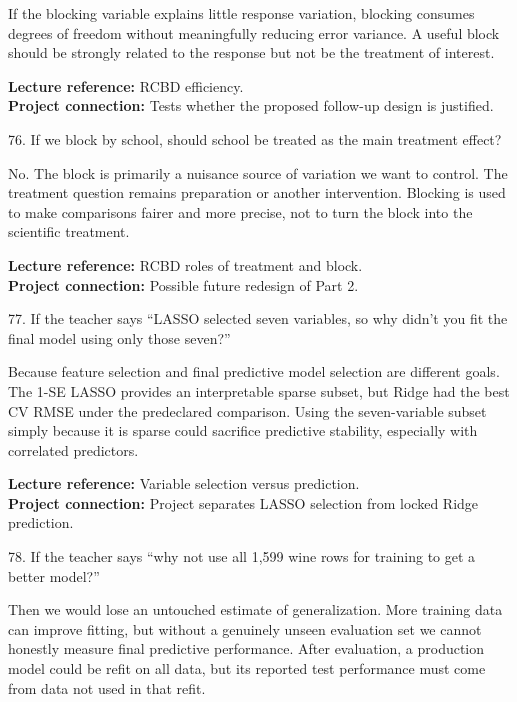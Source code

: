 \documentclass[10.5pt,a4paper]{article}
\newcommand{\chapref}[1]{\textbf{Lecture reference:} #1}
\newcommand{\projectref}[1]{\textbf{Project connection:} #1}
\begin{document}
\begin{answerbox}If the blocking variable explains little response variation, blocking consumes degrees of freedom without meaningfully reducing error variance. A useful block should be strongly related to the response but not be the treatment of interest.\end{answerbox}
\begin{refbox}\chapref{RCBD efficiency.}\\\projectref{Tests whether the proposed follow-up design is justified.}\end{refbox}
\begin{qbox}{76. If we block by school, should school be treated as the main treatment effect?}
\end{qbox}
\begin{answerbox}No. The block is primarily a nuisance source of variation we want to control. The treatment question remains preparation or another intervention. Blocking is used to make comparisons fairer and more precise, not to turn the block into the scientific treatment.\end{answerbox}
\begin{refbox}\chapref{RCBD roles of treatment and block.}\\\projectref{Possible future redesign of Part 2.}\end{refbox}
\begin{qbox}{77. If the teacher says ``LASSO selected seven variables, so why didn't you fit the final model using only those seven?''}
\end{qbox}
\begin{answerbox}Because feature selection and final predictive model selection are different goals. The 1-SE LASSO provides an interpretable sparse subset, but Ridge had the best CV RMSE under the predeclared comparison. Using the seven-variable subset simply because it is sparse could sacrifice predictive stability, especially with correlated predictors.\end{answerbox}
\begin{refbox}\chapref{Variable selection versus prediction.}\\\projectref{Project separates LASSO selection from locked Ridge prediction.}\end{refbox}
\begin{qbox}{78. If the teacher says ``why not use all 1,599 wine rows for training to get a better model?''}
\end{qbox}
\begin{answerbox}Then we would lose an untouched estimate of generalization. More training data can improve fitting, but without a genuinely unseen evaluation set we cannot honestly measure final predictive performance. After evaluation, a production model could be refit on all data, but its reported test performance must come from data not used in that refit.\end{answerbox}
\end{document}
